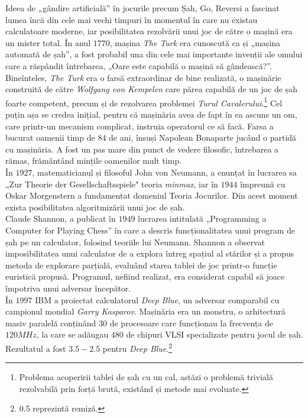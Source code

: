 \documentclass[12pt,twoside,a4paper,fleqn]{book}
\begin{document}
Ideea de „gândire artificială” în jocurile precum Șah, Go, Reversi a fascinat lumea încă din cele mai vechi timpuri în momentul în care nu existau calculatoare moderne, iar posibilitatea rezolvării unui joc de către o mașină era un mister total. În anul $1770$, mașina \emph{The Turk} era cunoscută ca și „mașina automată de șah”, a fost probabil una din cele mai importante invenții ale omului care a răspândit întrebarea, „Oare este capabilă o mașină să gândească?”. Bineînteles, \emph{The Turk} era o farsă extraordinar de bine realizată, o mașinărie construită de către \emph{Wolfgang von Kempelen} care părea capabilă de un joc de șah foarte competent, precum și de rezolvarea problemei \emph{Turul Cavalerului}.\footnote{Problema acoperirii tablei de șah cu un cal, astăzi o problemă trivială rezolvabilă prin forță brută, existând și metode mai evoluate.} Cel puțin așa se credea inițial, pentru că mașinăria avea de fapt în ea ascuns un om, care printr-un mecanism complicat, instruia operatorul ce să facă. Farsa a bucurat oamenii timp de $84$ de ani, însuși Napolean Bonaparte jucând o partidă cu mașinăria. A fost un pas mare din punct de vedere filosofic, întrebarea a rămas, frământând mințile oamenilor mult timp.\\
În $1927$, matematicianul și filosoful John von Neumann, a enunțat în lucrarea sa „Zur Theorie der Gesellschaftsspiele" teoria \emph{minmax}, iar în $1944$ împreună cu Oskar Morgenstern a fundamentat domeniul Teoria Jocurilor. Din acest moment exista posibilitatea algoritmizării unui joc de șah.\cite{Shoham}\cite{Allis}\\
Claude Shannon, a publicat în $1949$ lucrarea intitulată „Programming a Computer for Playing Chess” în care a descris funcționalitatea unui program de șah pe un calculator, folosind teoriile lui Neumann. Shannon a observat imposibilitatea unui calculator de a explora întreg spațiul al stărilor și a propus metoda de explorare parțială, evaluând starea tablei de joc printr-o funcție euristică propusă. Programul, nefiind realizat, era considerat capabil să joace împotriva unui adversar începător.\cite{Shannon}\\
În $1997$ IBM a proiectat calculatorul \emph{Deep Blue}, un adversar comparabil cu campionul mondial \emph{Garry Kasparov}. Mașinăria era un monstru, o arhitectură masiv paralelă conținând $30$ de procesoare care funcționau la frecvența de $120MHz$, la care se adăugau $480$ de chipuri VLSI specializate pentru jocul de șah. Rezultatul a fost $3.5 - 2.5$ pentru \emph{Deep Blue}.\footnote{0.5 reprezintă remiză.}\\
\end{document}
